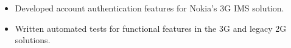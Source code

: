 \begin{minipage}{\linewidth}
\begin{itemize}
  \item Developed account authentication features for Nokia's 3G IMS solution.
  \item Written automated tests for functional features in the 3G and legacy 2G solutions.
\end{itemize}
\end{minipage}
\divider
